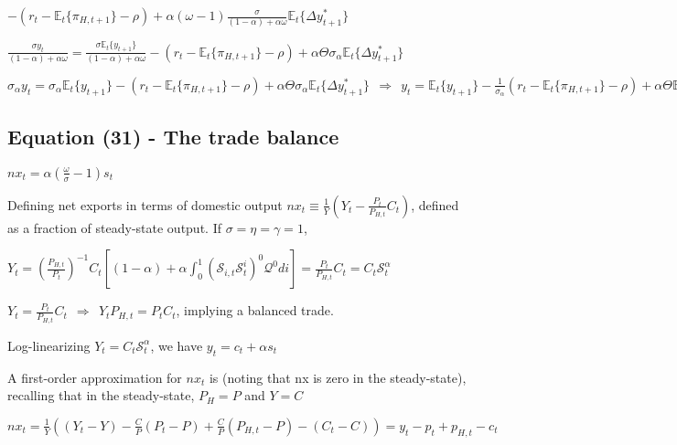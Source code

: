 \documentclass[
]{article}
\begin{document}
\(\displaystyle -(r_t-\mathbb{E}_t\{\pi_{H,t+1}\} -\rho)+ \alpha (\omega-1) \frac{\sigma}{(1-\alpha)+\alpha \omega} \mathbb{E}_t\{\Delta y_{t+1}^*\}\)

\(\displaystyle \frac{\sigma y_t}{(1-\alpha)+\alpha \omega}= \frac{\sigma \mathbb{E}_t\{y_{t+1}\} }{(1-\alpha)+\alpha \omega}-(r_t-\mathbb{E}_t\{\pi_{H,t+1}\} -\rho)+ \alpha \Theta \sigma_\alpha \mathbb{E}_t\{\Delta y_{t+1}^*\}\)

\(\displaystyle \sigma_\alpha y_t= \sigma_\alpha \mathbb{E}_t\{y_{t+1}\} -(r_t-\mathbb{E}_t\{\pi_{H,t+1}\} -\rho)+ \alpha \Theta \sigma_\alpha \mathbb{E}_t\{\Delta y_{t+1}^*\} \ \ \Rightarrow \ \  y_t= \mathbb{E}_t\{y_{t+1}\} -\frac{1}{\sigma_\alpha}(r_t-\mathbb{E}_t\{\pi_{H,t+1}\} -\rho)+ \alpha \Theta \mathbb{E}_t\{\Delta y_{t+1}^*\}\)

\vspace{12pt}

\hypertarget{equation-31---the-trade-balance}{%
\subsection{Equation (31) - The trade
balance}\label{equation-31---the-trade-balance}}

\(\displaystyle nx_t = \alpha \left(\frac{\omega}{\sigma} - 1 \right) s_t\)

\vspace{8pt}

Defining net exports in terms of domestic output
\(\displaystyle nx_t \equiv \frac{1}{Y}\left( Y_t - \frac{P_t}{P_{H,t}}C_t \right)\),
defined as a fraction of steady-state output. If
\(\sigma=\eta=\gamma=1\),

\(\displaystyle Y_t = \left( \frac{P_{H,t}}{P_t} \right)^{-1} C_t \left[ (1-\alpha) + \alpha \int_0^1 \left( \mathcal{S}_{i,t} \mathcal{S}_t^i\right)^{0} \mathcal{Q}^{0} di \right] = \frac{P_{t}}{P_{H,t}} C_t=C_t \mathcal{S}_t^\alpha\)

\(\displaystyle Y_t = \frac{P_{t}}{P_{H,t}} C_t \ \ \Rightarrow \ \ Y_t P_{H,t}=P_tC_t\),
implying a balanced trade.

Log-linearizing \(Y_t=C_t \mathcal{S}_t^\alpha\), we have
\(y_t = c_t + \alpha s_t\)

A first-order approximation for \(nx_t\) is (noting that nx is zero in
the steady-state), recalling that in the steady-state, \(P_H=P\) and
\(Y=C\)

\(\displaystyle nx_t = \frac{1}{Y} \left( (Y_t-Y)-\frac{C}{P}(P_t-P)+\frac{C}{P}(P_{H,t}-P) - (C_t-C) \right)=y_t-p_t+p_{H,t}-c_t\)
\end{document}
